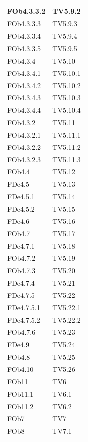 \begin{longtable}{|p{2.5cm}|p{5cm}|}
\hline
FOb4.3.3.2 & TV5.9.2\\
\hline
FOb4.3.3.3 & TV5.9.3\\
\hline
FOb4.3.3.4 & TV5.9.4\\
\hline
FOb4.3.3.5 & TV5.9.5\\
\hline
FOb4.3.4 & TV5.10\\ %
\hline
FOb4.3.4.1 & TV5.10.1\\
\hline
FOb4.3.4.2 & TV5.10.2\\
\hline
FOb4.3.4.3 & TV5.10.3\\
\hline
FOb4.3.4.4 & TV5.10.4\\
\hline
FOb4.3.2 & TV5.11\\ %
\hline
FOb4.3.2.1 & TV5.11.1\\
\hline
FOb4.3.2.2 & TV5.11.2\\
\hline
FOb4.3.2.3 & TV5.11.3\\
\hline
FOb4.4 & TV5.12\\ %
\hline
FDe4.5 & TV5.13\\ %
\hline
FDe4.5.1 & TV5.14\\  %
\hline
FDe4.5.2 & TV5.15\\ %
\hline
FDe4.6 & TV5.16\\ %
\hline
FOb4.7 & TV5.17\\ %
\hline
FDe4.7.1 & TV5.18\\ %
\hline
FOb4.7.2 & TV5.19\\ %
\hline
FOb4.7.3 & TV5.20\\ %
\hline
FDe4.7.4 & TV5.21\\ %
\hline
FDe4.7.5 & TV5.22\\ %
\hline
FDe4.7.5.1 & TV5.22.1\\ %
\hline
FDe4.7.5.2 & TV5.22.2\\ %
\hline 
FOb4.7.6 & TV5.23\\ %
\hline 
FDe4.9 & TV5.24\\ %
\hline
FOb4.8 & TV5.25\\ %
\hline
FOb4.10 & TV5.26\\%
\hline
FOb11 & TV6\\
\hline
FOb11.1 & TV6.1\\
\hline
FOb11.2 & TV6.2\\	
\hline
FOb7 & TV7\\
\hline
FOb8 & TV7.1\\
\hline
\end{longtable}








